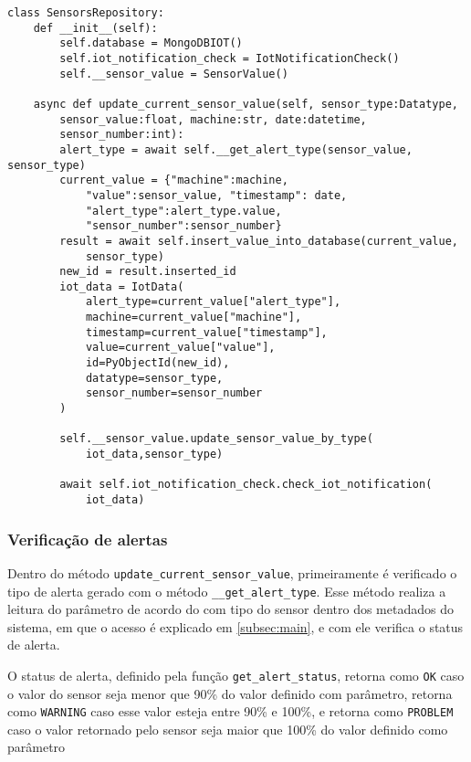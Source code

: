 \begin{verbatim}
class SensorsRepository:
    def __init__(self):
        self.database = MongoDBIOT()
        self.iot_notification_check = IotNotificationCheck()
        self.__sensor_value = SensorValue()

    async def update_current_sensor_value(self, sensor_type:Datatype,
        sensor_value:float, machine:str, date:datetime, 
        sensor_number:int):
        alert_type = await self.__get_alert_type(sensor_value, sensor_type)
        current_value = {"machine":machine,
            "value":sensor_value, "timestamp": date,
            "alert_type":alert_type.value,
            "sensor_number":sensor_number}
        result = await self.insert_value_into_database(current_value, 
            sensor_type)
        new_id = result.inserted_id
        iot_data = IotData(
            alert_type=current_value["alert_type"],
            machine=current_value["machine"],
            timestamp=current_value["timestamp"],
            value=current_value["value"],
            id=PyObjectId(new_id),
            datatype=sensor_type,
            sensor_number=sensor_number
        )
        
        self.__sensor_value.update_sensor_value_by_type(
            iot_data,sensor_type)
        
        await self.iot_notification_check.check_iot_notification(
            iot_data)
\end{verbatim}

\subsubsection{Verificação de alertas}

Dentro do método \texttt{update\_current\_sensor\_value}, primeiramente é verificado o tipo de alerta gerado com o método  \texttt{\_\_get\_alert\_type}. Esse método realiza a leitura do parâmetro de acordo do com tipo do sensor dentro dos metadados do sistema, em que o acesso é explicado em \ref{subsec:main}, e com ele verifica o status de alerta. 

O status de alerta, definido pela função  \texttt{get\_alert\_status}, retorna como \texttt{OK} caso o valor do sensor seja menor que 90\% do valor definido com parâmetro, retorna como \texttt{WARNING} caso esse valor esteja entre 90\% e 100\%, e retorna como \texttt{PROBLEM} caso o valor retornado pelo sensor seja maior que 100\% do valor definido como parâmetro

